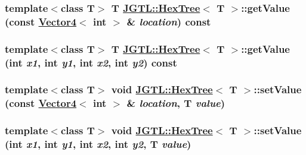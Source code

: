 \hypertarget{class_j_g_t_l_1_1_hex_tree_72f9d55be8d485f8ef551d6c27aab7d7}{
\subsubsection[getValue]{\setlength{\rightskip}{0pt plus 5cm}template$<$class T$>$ T \hyperlink{class_j_g_t_l_1_1_hex_tree}{JGTL::Hex\-Tree}$<$ T $>$::get\-Value (const \hyperlink{class_j_g_t_l_1_1_vector4}{Vector4}$<$ int $>$ \& {\em location}) const}}
\label{class_j_g_t_l_1_1_hex_tree_72f9d55be8d485f8ef551d6c27aab7d7}


\hypertarget{class_j_g_t_l_1_1_hex_tree_1d6ec3d8be42e25c77209fab1b350d43}{
\subsubsection[getValue]{\setlength{\rightskip}{0pt plus 5cm}template$<$class T$>$ T \hyperlink{class_j_g_t_l_1_1_hex_tree}{JGTL::Hex\-Tree}$<$ T $>$::get\-Value (int {\em x1}, int {\em y1}, int {\em x2}, int {\em y2}) const}}
\label{class_j_g_t_l_1_1_hex_tree_1d6ec3d8be42e25c77209fab1b350d43}


\hypertarget{class_j_g_t_l_1_1_hex_tree_e91ed4c6f6373541acc8dec5b82c91b4}{
\subsubsection[setValue]{\setlength{\rightskip}{0pt plus 5cm}template$<$class T$>$ void \hyperlink{class_j_g_t_l_1_1_hex_tree}{JGTL::Hex\-Tree}$<$ T $>$::set\-Value (const \hyperlink{class_j_g_t_l_1_1_vector4}{Vector4}$<$ int $>$ \& {\em location}, T {\em value})}}
\label{class_j_g_t_l_1_1_hex_tree_e91ed4c6f6373541acc8dec5b82c91b4}


\hypertarget{class_j_g_t_l_1_1_hex_tree_e39f7e05c965191d3809649ea4f7aad9}{
\subsubsection[setValue]{\setlength{\rightskip}{0pt plus 5cm}template$<$class T$>$ void \hyperlink{class_j_g_t_l_1_1_hex_tree}{JGTL::Hex\-Tree}$<$ T $>$::set\-Value (int {\em x1}, int {\em y1}, int {\em x2}, int {\em y2}, T {\em value})}}
\label{class_j_g_t_l_1_1_hex_tree_e39f7e05c965191d3809649ea4f7aad9}


